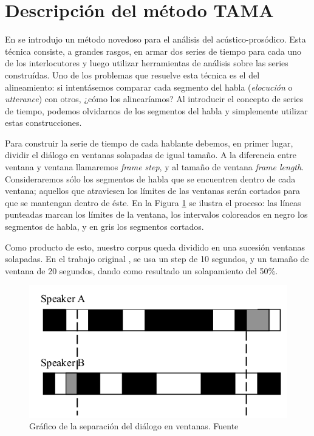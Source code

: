 \section{Descripción del método TAMA}
\label{sec:ant_tama}

En \cite{KOU2008} se introdujo un método novedoso para el análisis del \entrainment acústico-prosódico. Esta técnica consiste, a grandes rasgos, en armar dos series de tiempo para cada uno de los interlocutores y luego utilizar herramientas de análisis sobre las series construídas. Uno de los problemas que resuelve esta técnica es el del alineamiento: si intentásemos comparar cada segmento del habla (\emph{elocución} o \emph{utterance}) con otros, ¿cómo los alinearíamos? Al introducir el concepto de series de tiempo, podemos olvidarnos de los segmentos del habla y simplemente utilizar estas construcciones.

Para construir la serie de tiempo de cada hablante debemos, en primer lugar, dividir el diálogo en ventanas solapadas de igual tamaño. A la diferencia entre ventana y ventana llamaremos \emph{frame step}, y al tamaño de ventana \emph{frame length}. Consideraremos sólo los segmentos de habla que se encuentren dentro de cada ventana; aquellos que atraviesen los límites de las ventanas serán cortados para que se mantengan dentro de éste. En la Figura \ref{tama} se ilustra el proceso: las líneas punteadas marcan los límites de la ventana, los intervalos coloreados en negro los segmentos de habla, y en gris los segmentos cortados.

Como producto de esto, nuestro corpus queda dividido en una sucesión ventanas solapadas. En el trabajo original \cite{KOU2008}, se usa un step de 10 segundos, y un tamaño de ventana de 20 segundos, dando como resultado un solapamiento del 50\%.

\begin{figure}[t]
\centering
\includegraphics[scale=0.40]{images/tama.png}
\caption{Gráfico de la separación del diálogo en ventanas. Fuente \cite{KOU2008.2}}
\label{tama}
\end{figure}

